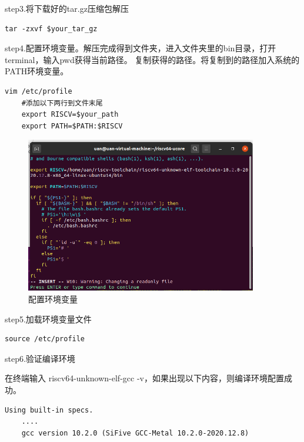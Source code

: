 step3.将下载好的tar.gz压缩包解压

\begin{lstlisting}[caption={解压命令}, label={lst:tar_command}]
    tar -zxvf $your_tar_gz
\end{lstlisting}

step4.配置环境变量。解压完成得到文件夹，进入文件夹里的bin目录，打开terminal，输入pwd获得当前路径。
复制获得的路径。将复制到的路径加入系统的PATH环境变量。

\begin{lstlisting}[caption={修改环境变量}, label={lst:change_env}]
    vim /etc/profile
    #添加以下两行到文件末尾
    export RISCV=$your_path
    export PATH=$PATH:$RISCV
\end{lstlisting}

\begin{figure}[htbp]
    \vspace{13pt} %
    \centering
    \includegraphics[width=0.9\textwidth]{images/env_path.png}
    \caption{配置环境变量}\label{配置环境变量} %
\end{figure}

step5.加载环境变量文件

\begin{lstlisting}[caption={加载环境变量文件}, label={lst:load_env_profile}]
    source /etc/profile
\end{lstlisting}

step6.验证编译环境

在终端输入 riscv64-unknown-elf-gcc -v，如果出现以下内容，则编译环境配置成功。

\begin{lstlisting}[caption={验证编译环境}, label={lst:check_env}]
    Using built-in specs.
    ....
    gcc version 10.2.0 (SiFive GCC-Metal 10.2.0-2020.12.8) 
\end{lstlisting}

